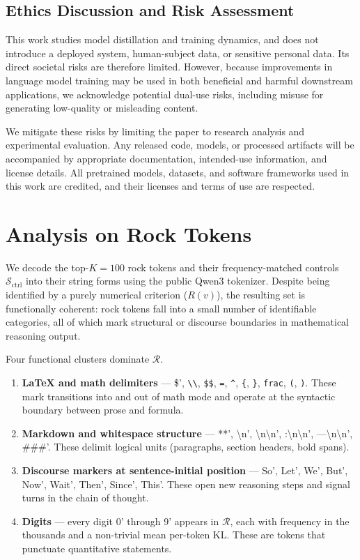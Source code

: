 \documentclass{article}
\begin{document}
\subsection{Ethics Discussion and Risk Assessment}

This work studies model distillation and training dynamics, and does not introduce a deployed system, human-subject data, or sensitive personal data. Its direct societal risks are therefore limited. However, because improvements in language model training may be used in both beneficial and harmful downstream applications, we acknowledge potential dual-use risks, including misuse for generating low-quality or misleading content.

We mitigate these risks by limiting the paper to research analysis and experimental evaluation. Any released code, models, or processed artifacts will be accompanied by appropriate documentation, intended-use information, and license details. All pretrained models, datasets, and software frameworks used in this work are credited, and their licenses and terms of use are respected.

\section{Analysis on Rock Tokens}
\label{analysis_rock}
 We decode the top-$K{=}100$ rock tokens and their frequency-matched controls $\mathcal{S}_{\text{ctrl}}$ into their string forms using the public Qwen3 tokenizer. Despite being identified by a purely numerical criterion ($R(v)$), the resulting set is functionally coherent: rock tokens fall into a small number of identifiable categories, all of which mark structural or discourse boundaries in mathematical reasoning output.

Four functional clusters dominate $\mathcal{R}$.
\begin{enumerate}
\item \textbf{LaTeX and math delimiters} — \$', \verb|\\|, \verb|$$|, \verb|=|, \verb|^|, \verb|{|, \verb|}|, \verb|frac|, \verb|(|, \verb|)|. These mark transitions into and out of math mode and operate at the syntactic boundary between prose and formula.   \item \textbf{Markdown and whitespace structure} — **', \textbackslash n', \textbackslash n\textbackslash n', :\textbackslash n\textbackslash n', ---\textbackslash n\textbackslash n', \#\#\#'. These delimit logical units (paragraphs, section headers, bold spans).   \item \textbf{Discourse markers at sentence-initial position} — So', Let', We', But', Now', Wait', Then', Since', This'. These open new reasoning steps and signal turns in the chain of thought.
\item \textbf{Digits} — every digit 0' through 9' appears in $\mathcal{R}$, each with frequency in the thousands and a non-trivial mean per-token KL. These are tokens that punctuate quantitative statements.
\end{enumerate}
\end{document}

